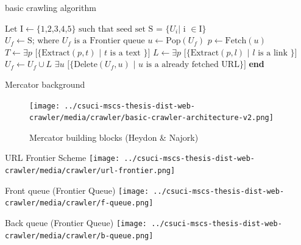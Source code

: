 \documentclass[9pt]{beamer}
\begin{document}
\begin{frame}{basic crawling algorithm}
  \begin{algorithm}[H]
    \begin{algorithmic}[1]
      \State $\text{Let I} \gets \text{\{1,2,3,4,5\}} \text{ such that seed set S = \{} U_i \text{| i } \in \text{I\}}$
      \State $U_f \gets \text{S; where } U_f \text{ is a Frontier queue}$
      \State $u \gets \text{Pop}(U_f)$ 
      \State $p \gets \text{Fetch}(u)$
      \State $T \gets \exists p\text{ [\{Extract}(p, t) \text{ | } t \text{ is a text \}]}$
      \State $L \gets \exists p\text{ [\{Extract}(p, l) \text{ | } l \text{ is a link \}]}$
      \State $U_f \gets U_f \cup L$
      \State $\exists u\text{ [\{Delete}(U_f, u) \text{ | } u \text{ is a already fetched URL\}]}$
      \EndWhile
      \EndProcedure
      \State \textbf{end}
    \end{algorithmic}
  \end{algorithm}
\end{frame}


\begin{frame}{Mercator background}
  \centering
  \begin{figure}
  \texttt{[image: ../csuci-mscs-thesis-dist-web-crawler/media/crawler/basic-crawler-architecture-v2.png]}
  \caption{Mercator building blocks (Heydon \& Najork)}
  \end{figure}
\end{frame}


\begin{frame}{URL Frontier Scheme}
  \centering
  \texttt{[image: ../csuci-mscs-thesis-dist-web-crawler/media/crawler/url-frontier.png]}
\end{frame}


\begin{frame}{Front queue (Frontier Queue)}
  \centering
  \texttt{[image: ../csuci-mscs-thesis-dist-web-crawler/media/crawler/f-queue.png]}
\end{frame}


\begin{frame}{Back queue (Frontier Queue)}
  \centering
  \texttt{[image: ../csuci-mscs-thesis-dist-web-crawler/media/crawler/b-queue.png]}
\end{frame}
\end{document}
